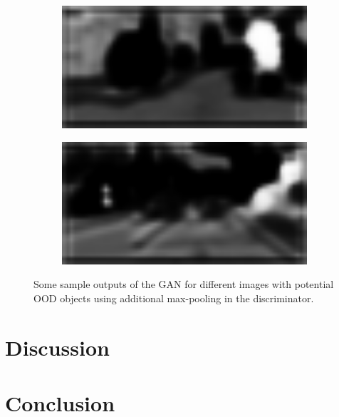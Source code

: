 \begin{figure}[b]
\begin{subfigure}{.5\textwidth}
	\end{subfigure}%
	\begin{subfigure}{.5\textwidth}
		\centering
		\includegraphics[width=1\textwidth]{Sources/Results/pooling/novelty_maps/novelty_map_4.png}
	\end{subfigure}
	\begin{subfigure}{.5\textwidth}
		\raggedleft
		\includegraphics[width=1\textwidth]{Sources/Results/pooling/novelty_maps/novelty_map_5.png}
	\end{subfigure}
	\caption[short]{Some sample outputs of the GAN for different images with potential OOD objects using additional max-pooling in the discriminator.} \label{fig:novelty_maps_pooling}
\end{figure}

\section{Discussion}
\section{Conclusion}